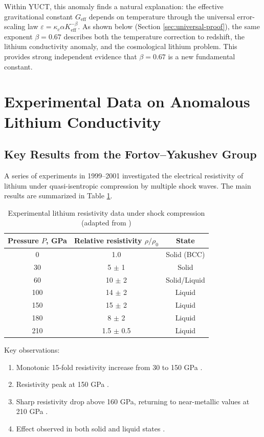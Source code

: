 \documentclass[12pt,a4paper]{article}
\theoremstyle{remark}
\newcommand{\Ke}{K_{\mathrm{eff}}}
\newcommand{\kappac}{\kappa_c}
\newcommand{\alp}{\alpha}
\begin{document}
	Within YUCT, this anomaly finds a natural explanation: the effective gravitational constant \(G_{\mathrm{eff}}\) depends on temperature through the universal error-scaling law \(\varepsilon = \kappac \alp \Ke^{-\beta}\). As shown below (Section \ref{sec:universal-proof}), the same exponent \(\beta = 0.67\) describes both the temperature correction to redshift, the lithium conductivity anomaly, and the cosmological lithium problem. This provides strong independent evidence that \(\beta = 0.67\) is a new fundamental constant.
	
	\section{Experimental Data on Anomalous Lithium Conductivity}
	
	\subsection{Key Results from the Fortov–Yakushev Group}
	
	A series of experiments in 1999–2001 \cite{fortov1999, fortov2001, yakushev2002} investigated the electrical resistivity of lithium under quasi-isentropic compression by multiple shock waves. The main results are summarized in Table \ref{tab:exp_data}.
	
	\begin{table}[h]
		\centering
		\caption{Experimental lithium resistivity data under shock compression (adapted from \cite{fortov2001, yakushev2002})}
		\label{tab:exp_data}
		\begin{tabular}{ccc}
			\toprule
			Pressure \(P\), GPa & Relative resistivity \(\rho/\rho_0\) & State \\
			\midrule
			0 & 1.0 & Solid (BCC) \\
			30 & 5 \(\pm\) 1 & Solid \\
			60 & 10 \(\pm\) 2 & Solid/Liquid \\
			100 & 14 \(\pm\) 2 & Liquid \\
			150 & 15 \(\pm\) 2 & Liquid \\
			180 & 8 \(\pm\) 2 & Liquid \\
			210 & 1.5 \(\pm\) 0.5 & Liquid \\
			\bottomrule
		\end{tabular}
	\end{table}
	
	Key observations:
	\begin{enumerate}
		\item Monotonic 15-fold resistivity increase from 30 to 150 GPa \cite{fortov2001}.
		\item Resistivity peak at 150 GPa \cite{yakushev2002}.
		\item Sharp resistivity drop above 160 GPa, returning to near-metallic values at 210 GPa \cite{yakushev2002}.
		\item Effect observed in both solid and liquid states \cite{fortov2001}.
	\end{enumerate}
	
\end{document}
